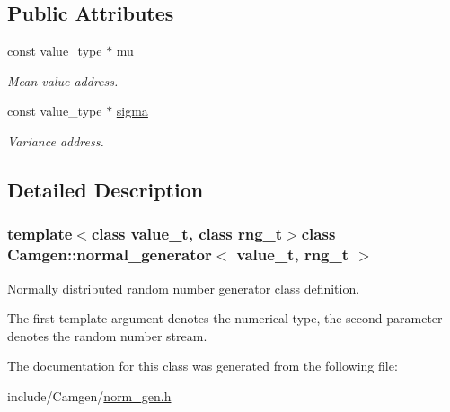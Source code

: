 \subsection*{Public Attributes}
\begin{DoxyCompactItemize}
\item 
\hypertarget{a00381_acdc632d3b47eca58b47c94030311dca4}{const value\-\_\-type $\ast$ \hyperlink{a00381_acdc632d3b47eca58b47c94030311dca4}{mu}}\label{a00381_acdc632d3b47eca58b47c94030311dca4}

\begin{DoxyCompactList}\small\item\em Mean value address. \end{DoxyCompactList}\item 
\hypertarget{a00381_abf64e0c0479116b3ffce47d39ad43df2}{const value\-\_\-type $\ast$ \hyperlink{a00381_abf64e0c0479116b3ffce47d39ad43df2}{sigma}}\label{a00381_abf64e0c0479116b3ffce47d39ad43df2}

\begin{DoxyCompactList}\small\item\em Variance address. \end{DoxyCompactList}\end{DoxyCompactItemize}


\subsection{Detailed Description}
\subsubsection*{template$<$class value\-\_\-t, class rng\-\_\-t$>$class Camgen\-::normal\-\_\-generator$<$ value\-\_\-t, rng\-\_\-t $>$}

Normally distributed random number generator class definition. 

The first template argument denotes the numerical type, the second parameter denotes the random number stream. 

The documentation for this class was generated from the following file\-:\begin{DoxyCompactItemize}
\item 
include/\-Camgen/\hyperlink{a00679}{norm\-\_\-gen.\-h}\end{DoxyCompactItemize}
